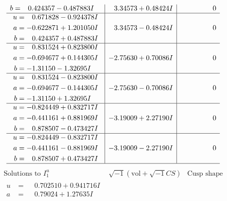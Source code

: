 \documentclass[1p]{elsarticle_modified}
\theoremstyle{definition}
\newcommand{\I}{\sqrt{-1}}
\begin{document}
$$\begin{array}{c|c|c}
\begin{aligned}
b &= \phantom{-}0.424357 - 0.487883 I\end{aligned}
 & \phantom{-}3.34573 + 0.48424 I & \phantom{-0.000000 } 0 \\ \hline\begin{aligned}
u &= \phantom{-}0.671828 - 0.924378 I \\
a &= -0.622871 + 1.201050 I \\
b &= \phantom{-}0.424357 + 0.487883 I\end{aligned}
 & \phantom{-}3.34573 - 0.48424 I & \phantom{-0.000000 } 0 \\ \hline\begin{aligned}
u &= \phantom{-}0.831524 + 0.823800 I \\
a &= -0.694677 + 0.144305 I \\
b &= -1.31150 - 1.32695 I\end{aligned}
 & -2.75630 + 0.70086 I & \phantom{-0.000000 } 0 \\ \hline\begin{aligned}
u &= \phantom{-}0.831524 - 0.823800 I \\
a &= -0.694677 - 0.144305 I \\
b &= -1.31150 + 1.32695 I\end{aligned}
 & -2.75630 - 0.70086 I & \phantom{-0.000000 } 0 \\ \hline\begin{aligned}
u &= -0.824449 + 0.832717 I \\
a &= -0.441161 + 0.881969 I \\
b &= \phantom{-}0.878507 - 0.473427 I\end{aligned}
 & -3.19009 + 2.27190 I & \phantom{-0.000000 } 0 \\ \hline\begin{aligned}
u &= -0.824449 - 0.832717 I \\
a &= -0.441161 - 0.881969 I \\
b &= \phantom{-}0.878507 + 0.473427 I\end{aligned}
 & -3.19009 - 2.27190 I & \phantom{-0.000000 } 0\\
 \hline 
 \end{array}$$\newpage$$\begin{array}{c|c|c}  
\text{Solutions to }I^u_{1}& \I (\text{vol} + \sqrt{-1}CS) & \text{Cusp shape}\\
 \hline 
\begin{aligned}
u &= \phantom{-}0.702510 + 0.941716 I \\
a &= \phantom{-}0.79024 + 1.27635 I \\

\end{aligned}
\end{array}$$
\end{document}
